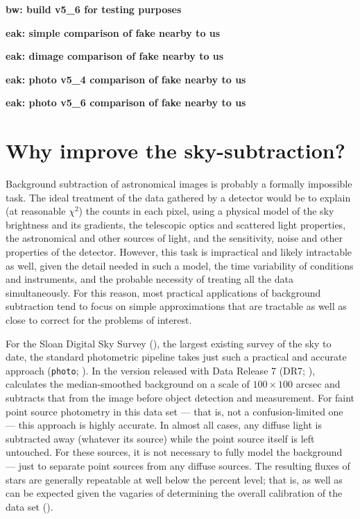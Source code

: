 \documentclass[10pt,preprint]{aastex}
\begin{document}
{\bf bw: build v5\_6 for testing purposes}

{\bf eak: simple comparison of fake nearby to us}

{\bf eak: dimage comparison of fake nearby to us}

{\bf eak: photo v5\_4 comparison of fake nearby to us}

{\bf eak: photo v5\_6 comparison of fake nearby to us}

\section{ Why improve the sky-subtraction?}
\label{sec:intro}

Background subtraction of astronomical images is probably a formally
impossible task.  The ideal treatment of the data gathered by a
detector would be to explain (at reasonable $\chi^2$) the counts in
each pixel, using a physical model of the sky brightness and its
gradients, the telescopic optics and scattered light properties, the
astronomical and other sources of light, and the sensitivity, noise
and other properties of the detector. 
However, this task is impractical and likely intractable as well,
given the detail needed in such a model, the time variability of
conditions and instruments, and the probable necessity of treating all
the data simultaneously. For this reason, most practical applications
of background subtraction tend to focus on simple approximations that
are tractable as well as close to correct for the problems of
interest.

For the Sloan Digital Sky Survey (\citealt{york00a}), the largest
existing survey of the sky to date, the standard photometric pipeline
takes just such a practical and accurate approach ({\tt photo};
\citealt{lupton01a}). In the version released with Data Release 7
(DR7; \citealt{abazajian09a}), calculates the median-smoothed
background on a scale of $100\times100$ arcsec and subtracts that from
the image before object detection and measurement. For faint point
source photometry in this data set --- that is, not a
confusion-limited one --- this approach is highly accurate. In almost
all cases, any diffuse light is subtracted away (whatever its source)
while the point source itself is left untouched. For these sources, it
is not necessary to fully model the background --- just to separate
point sources from any diffuse sources. The resulting fluxes of stars
are generally repeatable at well below the percent level; that is, as
well as can be expected given the vagaries of determining the overall
calibration of the data set (\citealt{padmanabhan07a}).
\end{document}
